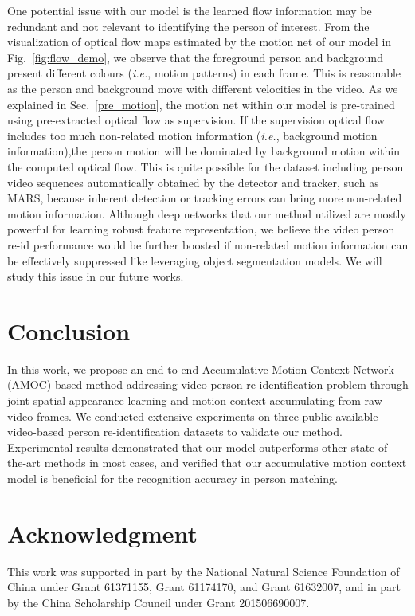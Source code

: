 \documentclass[journal]{IEEEtran}
\begin{document}
One potential issue with our model is the learned flow information may be redundant and not relevant to identifying the person of interest. From the visualization of optical flow maps estimated by the motion net of our model in Fig.~\ref{fig:flow_demo}, we observe that the foreground person and background present different colours (\textit{i.e.}, motion patterns)  in each frame. This is reasonable as the person and background move with different velocities in the video. As we explained in Sec.~\ref{pre_motion}, the motion net within our model is pre-trained using pre-extracted optical flow as supervision. If the supervision optical flow includes too much non-related motion information (\textit{i.e.}, background motion information),the person motion will be dominated by background motion within the computed optical flow. This is quite possible for the dataset including person video sequences automatically obtained by the detector and tracker, such as MARS, because inherent detection or tracking errors can bring more non-related motion information. Although deep networks that our method utilized are mostly powerful for learning robust feature representation, we believe the video person re-id performance would be further boosted if non-related motion information can be effectively suppressed like leveraging object segmentation models. We will study this issue in our future works.  


\section{Conclusion}
In this work, we propose an end-to-end Accumulative Motion Context Network (AMOC) based method addressing video person re-identification problem through joint spatial appearance learning and motion context accumulating from raw video frames. We conducted extensive experiments on three public available video-based person re-identification datasets to validate our method. Experimental results demonstrated that our model outperforms other state-of-the-art methods in most cases, and verified that our accumulative motion context model is beneficial for the recognition accuracy in person matching.

\section*{Acknowledgment}
This work was supported in part by the National Natural Science Foundation of China under Grant 61371155, Grant 61174170, and Grant 61632007, and in part by the China Scholarship Council under Grant 201506690007. 
\end{document}
